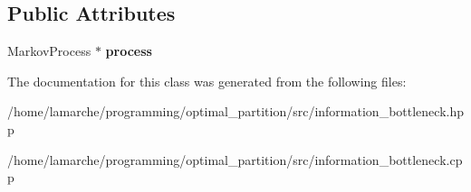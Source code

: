 \subsection*{Public Attributes}
\begin{DoxyCompactItemize}
\item 
\hypertarget{classInformationBottleneck_a0d288b82a5d34dff1210d54383ce5997}{Markov\-Process $\ast$ {\bfseries process}}\label{classInformationBottleneck_a0d288b82a5d34dff1210d54383ce5997}

\end{DoxyCompactItemize}


The documentation for this class was generated from the following files\-:\begin{DoxyCompactItemize}
\item 
/home/lamarche/programming/optimal\-\_\-partition/src/information\-\_\-bottleneck.\-hpp\item 
/home/lamarche/programming/optimal\-\_\-partition/src/information\-\_\-bottleneck.\-cpp\end{DoxyCompactItemize}

